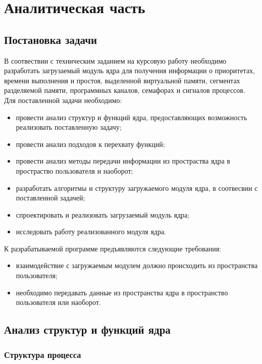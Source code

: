 \chapter{Аналитическая часть}

\section{Постановка задачи}

В соотвествии с техническим заданием на курсовую работу необходимо разработать загрузаемый модуль ядра  для получения информации о приоритетах, времени выполнения и простоя, выделенной виртуальной памяти, сегментах разделяемой памяти, программных каналов, семафорах и сигналов процессов. Для поставленной задачи необходимо:

\begin{itemize}
	\item провести анализ структур и функций ядра, предоставляющих возможность реализовать поставленную задачу;
	\item провести анализ подходов к перехвату функций; 
	\item провести анализ методы передачи информации из простраства ядра в простраство пользователя и наоборот;
	\item разработать алгоритмы и структуру загружаемого модуля ядра, в соотвесвии с поставленной задачей;
	\item спроектировать и реализовать загрузаемый модуль ядра;
	\item исследовать работу реализованного модуля ядра.
\end{itemize}

К разрабатываемой программе предъявляются следующие требования:

\begin{itemize}
	\item взаимодействие с загружаемым модулем должно происходить из пространства пользователя; 
	\item необходимо передавать данные из пространства ядра в пространство пользователя или наоборот.
\end{itemize}

\clearpage

\section{Анализ структур и функций ядра}

\subsection{Структура процесса}

